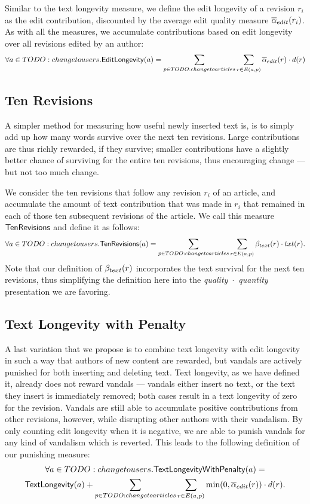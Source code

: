 \noindent
Similar to the text longevity measure, we define the edit longevity
of a revision $r_i$ as the edit contribution, discounted by the 
average edit quality measure ${\overline{\alpha}}_{edit}(r_i)$.
As with all the measures, we accumulate contributions based on 
edit longevity over all revisions edited by an author:
%
\[
\forall a \in TODO: change to users .
\mathsf{EditLongevity}(a) = \sum_{p \in TODO: change to articles} \sum_{r \in E(a, p)} 
{\overline{\alpha}}_{edit}(r) \cdot d(r)
\]
%

\subsection{Ten Revisions}

\noindent
A simpler method for measuring how useful newly inserted
text is, is to simply add up how many words survive over
the next ten revisions.
Large contributions are thus richly rewarded, if they survive;
smaller contributions have a slightly better chance of surviving
for the entire ten revisions, thus encouraging change ---
but not too much change.

We consider the ten revisions that follow any revision $r_i$ of an 
article, and accumulate the amount of text contribution that was made 
in $r_i$ that remained in each of those ten subsequent revisions
of the article.
We call this measure $\mathsf{TenRevisions}$ and define it as follows:
%
\begin{gather*}
\forall a \in TODO: change to users .
\mathsf{TenRevisions}(a) = 
\sum_{p \in TODO: change to articles} \sum_{r \in E(a, p)} \beta_{text}(r) \cdot txt(r).
\end{gather*}
%
Note that our definition of $\beta_{text}(r)$ incorporates
the text survival for the next ten revisions,
thus simplifying the definition here
into the \textit{quality}~$\cdot$~\textit{quantity}
presentation we are favoring.

\subsection{Text Longevity with Penalty}

\noindent
A last variation that we propose is to combine text longevity with 
edit longevity in such a way that authors of new content are rewarded, 
but vandals are actively punished for both inserting and deleting text.
Text longevity, as we have defined it, already does not
reward vandals --- vandals either insert no text, or the
text they insert is immediately removed; both cases result
in a text longevity of zero for the revision.
Vandals are still able to accumulate positive contributions
from other revisions, however, while disrupting other
authors with their vandalism.
By only counting edit longevity when it is negative,
we are able to punish vandals for any kind of vandalism
which is reverted.
This leads to the following definition of our punishing 
measure:
%
\begin{gather*}
\forall a \in TODO: change to users .
\mathsf{TextLongevityWithPenalty}(a) = \\
\mathsf{TextLongevity}(a) +
\sum_{p \in TODO: change to articles} \sum_{r \in E(a, p)} \min(0, {\overline{\alpha}}_{edit}(r)) \cdot d(r).
\end{gather*}
%


